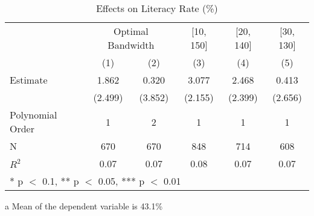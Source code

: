 \begin{table}[!h]

\caption{Effects on Literacy Rate (\%) \label{tab:rdd_literacy}}
\centering
\begin{threeparttable}
\begin{tabular}[t]{lccccc}
\toprule
\multicolumn{1}{c}{} & \multicolumn{2}{c}{Optimal Bandwidth} & \multicolumn{1}{c}{[10, 150]} & \multicolumn{1}{c}{[20, 140]} & \multicolumn{1}{c}{[30, 130]} \\
\cmidrule(l{3pt}r{3pt}){2-3} \cmidrule(l{3pt}r{3pt}){4-4} \cmidrule(l{3pt}r{3pt}){5-5} \cmidrule(l{3pt}r{3pt}){6-6}
  & (1) & (2) & (3) & (4) & (5)\\
\midrule
Estimate & \num{1.862} & \num{0.320} & \num{3.077} & \num{2.468} & \num{0.413}\\
 & (\num{2.499}) & (\num{3.852}) & (\num{2.155}) & (\num{2.399}) & (\num{2.656})\\

\midrule
Polynomial Order & 1 & 2 & 1 & 1 & 1\\
N & \num{670} & \num{670} & \num{848} & \num{714} & \num{608}\\
$R^2$ & \num{0.07} & \num{0.07} & \num{0.08} & \num{0.07} & \num{0.07}\\
\bottomrule
\multicolumn{6}{l}{\rule{0pt}{1em}* p $<$ 0.1, ** p $<$ 0.05, *** p $<$ 0.01}\\
\end{tabular}
\begin{tablenotes}
\item[a] Mean of the dependent variable is 43.1\%
\end{tablenotes}
\end{threeparttable}
\end{table}
